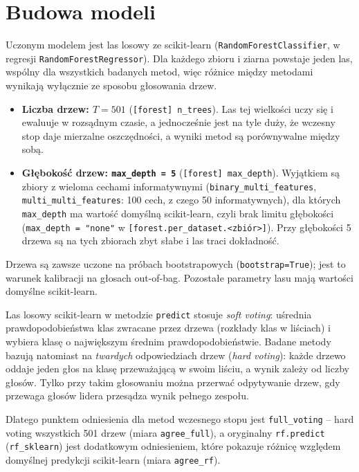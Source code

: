 \documentclass{article}
\newcommand{\code}[1]{\texttt{#1}}
\begin{document}
\section{Budowa modeli}
\label{sec:modele}


Uczonym modelem jest las losowy ze scikit-learn (\code{RandomForestClassifier},
w regresji \code{RandomForestRegressor}). Dla każdego zbioru i ziarna powstaje jeden las,
wspólny dla wszystkich badanych metod, więc różnice między metodami wynikają wyłącznie
ze sposobu głosowania drzew.

\begin{itemize}[leftmargin=*]
  \item \textbf{Liczba drzew: $T = 501$} (\code{[forest] n\_trees}). Las tej wielkości
        uczy się i ewaluuje w rozsądnym czasie, a jednocześnie jest na tyle duży, że
        wczesny stop daje mierzalne oszczędności, a wyniki metod są porównywalne między sobą.
  \item \textbf{Głębokość drzew: \code{max\_depth = 5}} (\code{[forest] max\_depth}).
        Wyjątkiem są zbiory z wieloma cechami informatywnymi (\code{binary\_multi\_features},
        \code{multi\_multi\_features}: 100 cech, z czego 50 informatywnych), dla których
        \code{max\_depth} ma wartość domyślną scikit-learn, czyli brak limitu głębokości
        (\code{max\_depth = "none"} w \code{[forest.per\_dataset.<zbiór>]}). Przy
        głębokości 5 drzewa są na tych zbiorach zbyt słabe i las traci dokładność.
\end{itemize}

Drzewa są zawsze uczone na próbach bootstrapowych (\code{bootstrap=True}); jest to
warunek kalibracji na głosach out-of-bag. Pozostałe parametry lasu mają wartości
domyślne scikit-learn.

Las losowy scikit-learn w metodzie \code{predict} stosuje \emph{soft voting}: uśrednia
prawdopodobieństwa klas zwracane przez drzewa (rozkłady klas w liściach) i wybiera klasę
o największym średnim prawdopodobieństwie. Badane metody bazują natomiast na
\emph{twardych} odpowiedziach drzew (\emph{hard voting}): każde drzewo oddaje jeden głos
na klasę przeważającą w swoim liściu, a wynik zależy od liczby głosów. Tylko przy takim
głosowaniu można przerwać odpytywanie drzew, gdy przewaga głosów lidera przesądza wynik
pełnego zespołu.

Dlatego punktem odniesienia dla metod wczesnego stopu jest \code{full\_voting} --
hard voting wszystkich 501 drzew (miara \code{agree\_full}), a oryginalny \code{rf.predict}
(\code{rf\_sklearn}) jest dodatkowym odniesieniem, które pokazuje różnicę względem
domyślnej predykcji scikit-learn (miara \code{agree\_rf}).
\end{document}
